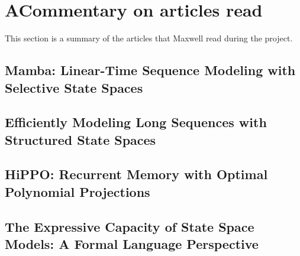 \section*{A\quad Commentary on articles read}
This section is a summary of the articles that Maxwell read during the project.
\subsection{Mamba: Linear-Time Sequence Modeling with Selective State Spaces}
\subsection{Efficiently Modeling Long Sequences with Structured State Spaces}
\subsection{HiPPO: Recurrent Memory with Optimal Polynomial Projections}
\subsection{The Expressive Capacity of State Space Models: A Formal Language Perspective}
